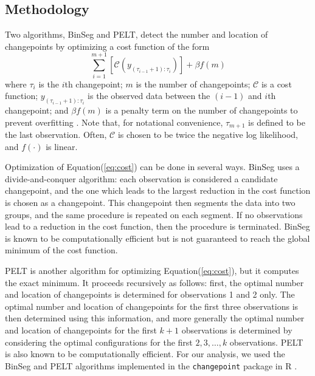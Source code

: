 \documentclass[12pt]{article}
\begin{document}
\begin{doublespacing}
\subsection{Methodology}
\label{ssec:methodology}

Two algorithms, BinSeg and PELT, detect the number and location of changepoints by optimizing a cost function of the form
\begin{equation}
	\sum_{i=1}^{m+1} [\mathcal{C}(y_{(\tau_{i-1}+1):\tau_i})] + \beta f(m)
	\label{eq:cost}
\end{equation}
where $\tau_i$ is the $i$th changepoint; $m$ is the number of changepoints; $\mathcal{C}$ is a cost function; $y_{(\tau_{i-1}+1):\tau_i}$ is the observed data between the $(i-1)$ and $i$th changepoint; and $\beta f(m)$ is a penalty term on the number of changepoints to prevent overfitting \cite{killick12}.  Note that, for notational convenience, $\tau_{m+1}$ is defined to be the last observation.  Often, $\mathcal{C}$ is chosen to be twice the negative log likelihood, and $f(\cdot)$ is linear.

Optimization of Equation(\ref{eq:cost}) can be done in several ways.  BinSeg uses a divide-and-conquer algorithm: each observation is considered a candidate changepoint, and the one which leads to the largest reduction in the cost function is chosen as a changepoint.  This changepoint then segments the data into two groups, and the same procedure is repeated on each segment.  If no observations lead to a reduction in the cost function, then the procedure is terminated.  BinSeg is known to be computationally efficient but is not guaranteed to reach the global minimum of the cost function.

PELT is another algorithm for optimizing Equation(\ref{eq:cost}), but it computes the exact minimum.  It proceeds recursively as follows: first, the optimal number and location of changepoints is determined for observations 1 and 2 only.  The optimal number and location of changepoints for the first three observations is then determined using this information, and more generally the optimal number and location of changepoints for the first $k+1$ observations is determined by considering the optimal configurations for the first $2, 3, \ldots, k$ observations.  PELT is also known to be computationally efficient.  For our analysis, we used the BinSeg and PELT algorithms implemented in the \texttt{changepoint} package in R \cite{killick14}.


\end{doublespacing}
\end{document}
